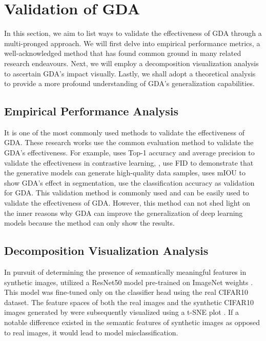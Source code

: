 \documentclass[preprint,12pt,authoryear]{elsarticle}
\begin{document}
\section{Validation of GDA}
In this section, we aim to list ways to validate the effectiveness of GDA through a multi-pronged approach. We will first delve into empirical performance metrics, a well-acknowledged method that has found common ground in many related research endeavours. Next, we will employ a decomposition visualization analysis to ascertain GDA's impact visually. Lastly, we shall adopt a theoretical analysis to provide a more profound understanding of GDA's generalization capabilities.
\subsection{Empirical Performance Analysis}
It is one of the most commonly used methods to validate the effectiveness of GDA. These research works use the common evaluation method to validate the GDA's effectiveness. For example, \cite{143_representation} uses Top-1 accuracy and average precision to validate the effectiveness in contrastive learning,  \cite{104_direct_use}, \cite{119_prompt_structure} use FID\cite{172_FID} to demonstrate that the generative models can generate high-quality data samples, \cite{173_segmentation} uses mIOU to show GDA's effect in segmentation, \cite{9_labelling_diffusion,105_direct_use} use the classification accuracy as validation for GDA. This validation method is commonly used and can be easily used to validate the effectiveness of GDA. However, this method can not shed light on the inner reasons why GDA can improve the generalization of deep learning models because the method can only show the results.
\subsection{Decomposition Visualization Analysis}
In pursuit of determining the presence of semantically meaningful features in synthetic images, \cite{119_prompt_structure} utilized a ResNet50 model \cite{174_resnet} pre-trained on ImageNet weights \cite{175_imagenet}. This model was fine-tuned only on the classifier head using the real CIFAR10 dataset. The feature spaces of both the real images and the synthetic CIFAR10 images generated by \cite{119_prompt_structure} were subsequently visualized using a t-SNE plot \cite{176_tsn}. If a notable difference existed in the semantic features of synthetic images as opposed to real images, it would lead to model misclassification.
\end{document}
